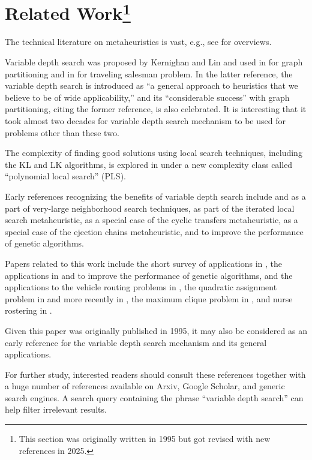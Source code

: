 \section{Related Work\protect\footnote{This section was originally written in
  1995 but got revised with new references in 2025.}
}
\label{sec:related}

The technical literature on metaheuristics is vast, e.g., see
\cite{AhErOr02,LoMaSt02,MaPaRe18,PiRo10,SoSeGl18,Wi20} for
overviews.

Variable depth search was proposed by Kernighan and Lin and used in
\cite{KeLi70} for graph partitioning and in \cite{LiKe73} for
traveling salesman problem. In the latter reference, the variable
depth search is introduced as ``a general approach to heuristics that
we believe to be of wide applicability,'' and its ``considerable
success'' with graph partitioning, citing the former reference, is
also celebrated. It is interesting that it took almost two decades for
variable depth search mechanism to be used for problems other than
these two.

The complexity of finding good solutions using local search
techniques, including the KL and LK algorithms, is explored in
\cite{JoPaYa88,PaScYa90} under a new complexity class called
``polynomial local search'' (PLS).

Early references recognizing the benefits of variable depth search
include \cite{AhErOr02} and \cite{PiRo10} as a part of very-large
neighborhood search techniques, \cite{LoMaSt01} as part of the
iterated local search metaheuristic, \cite{ThOr89} as a special case
of the cyclic transfers metaheuristic, \cite{Gl96} as a special case
of the ejection chains metaheuristic, \cite{Gr03} and \cite{MeFr02} to
improve the performance of genetic algorithms.

Papers related to this work include the short survey of applications
in \cite{AhErOr02}, the applications in \cite{Gr03} and \cite{MeFr02}
to improve the performance of genetic algorithms, and the applications
to the vehicle routing problems in \cite{VaLeSc90,VaLeSc93}, the
quadratic assignment problem in \cite{Sk90} and more recently in
\cite{GoGo12,MeFr02,Pa09}, the maximum clique problem in
\cite{KaSaNa07}, and nurse rostering in \cite{BuCuQu07}.

Given this paper was originally published in 1995, it may also be
considered as an early reference for the variable depth search
mechanism and its general applications.

For further study, interested readers should consult these references
together with a huge number of references available on Arxiv, Google
Scholar, and generic search engines. A search query containing the
phrase ``variable depth search'' can help filter irrelevant results.
